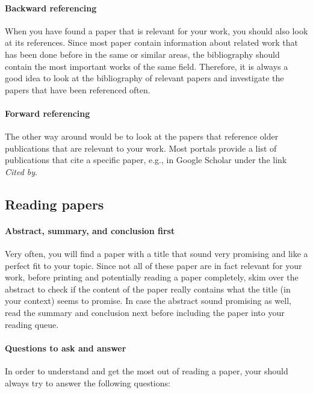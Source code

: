 \documentclass{article}
\begin{document}
\paragraph{Backward referencing}

When you have found a paper that is relevant for your work, you should also look at its references.
Since most paper contain information about related work that has been done before in the same or similar areas, the bibliography should contain the most important works of the same field.
Therefore, it is always a good idea to look at the bibliography of relevant papers and investigate the papers that have been referenced often.

\paragraph{Forward referencing}

The other way around would be to look at the papers that reference older publications that are relevant to your work.
Most portals provide a list of publications that cite a specific paper, e.g., in Google Scholar under the link \emph{Cited by}.



\subsection{Reading papers}

\paragraph{Abstract, summary, and conclusion first}

Very often, you will find a paper with a title that sound very promising and like a perfect fit to your topic.
Since not all of these paper are in fact relevant for your work, before printing and potentially reading a paper completely, skim over the abstract to check if the content of the paper really contains what the title (in your context) seems to promise.
In case the abstract sound promising as well, read the summary and conclusion next before including the paper into your reading queue.


\paragraph{Questions to ask and answer}

In order to understand and get the most out of reading a paper, your should always try to answer the following questions:
\end{document}
